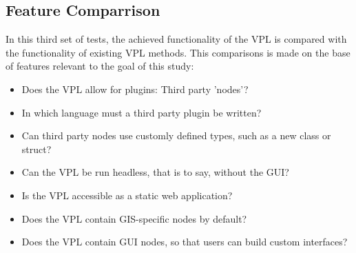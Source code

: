 




\subsection{Feature Comparrison}
\label{sec:method:tests:features}

In this third set of tests, the achieved functionality of the VPL is compared with the functionality of existing VPL methods. 
This comparisons is made on the base of features relevant to the goal of this study:
\begin{itemize}[-]
  \item Does the VPL allow for plugins: Third party 'nodes'?  
  \item In which language must a third party plugin be written?
  \item Can third party nodes use customly defined types, such as a new class or struct?
  \item Can the VPL be run headless, that is to say, without the \ac{GUI}?
  \item Is the VPL accessible as a static web application?
  \item Does the VPL contain GIS-specific nodes by default?
  \item Does the VPL contain \ac{GUI} nodes, so that users can build custom interfaces?
\end{itemize}

